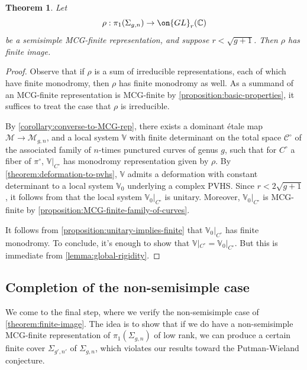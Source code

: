 \documentclass[12 pt]{amsart}
\theoremstyle{plain}
\newtheorem{theorem}[subsubsection]{Theorem}
\theoremstyle{definition}
\theoremstyle{remark}
\numberwithin{equation}{section}
\begin{document}
\begin{theorem}
	\label{theorem:finite-image-semisimple}
	Let $$\rho: \pi_1(\Sigma_{g,n})\to \on{GL}_r(\mathbb{C})$$ be a semisimple MCG-finite representation, and suppose $r<\sqrt{g+1}$. Then $\rho$ has finite image.
\end{theorem}
\begin{proof}
	Observe that if $\rho$ is a sum of irreducible representations, each of
	which have finite monodromy, then $\rho$ has finite monodromy as well.
	As a summand of an MCG-finite representation is MCG-finite by
	\autoref{proposition:basic-properties}, it suffices to treat the case that $\rho$ is irreducible.

	By \autoref{corollary:converse-to-MCG-rep}, there exists a dominant
	\'etale map $\mathscr{M}\to \mathscr{M}_{g,n}$, and a local system
	$\mathbb{V}$ with finite determinant on the total space $\mathscr{C}^\circ$ of the associated
	family of $n$-times punctured curves of genus $g$, such that for
	$C^\circ$ a fiber of $\pi^\circ$, $\mathbb{V}|_{{C}^\circ}$ has monodromy representation given by $\rho$. 
		By \autoref{theorem:deformation-to-pvhs}, $\mathbb V$ admits a deformation with constant determinant to a
	local system $\mathbb V_0$ underlying a complex PVHS.
	Since $r < 2\sqrt{g+1}$, it follows from \cite[Theorem
	1.2.12]{LL:geometric-local-systems} that
	the local system $\mathbb V_0|_{{C}^\circ}$ is unitary. Moreover, $\mathbb V_0|_{{C}^\circ}$ is MCG-finite by \autoref{proposition:MCG-finite-family-of-curves}.
	
	It follows from \autoref{proposition:unitary-implies-finite}
	that $\mathbb V_0|_{{C}^\circ}$ has finite monodromy.
	To conclude, it's enough to show that $\mathbb V|_{{C}^\circ} =
	\mathbb V_0|_{{C}^\circ}$.
	But this is immediate from \autoref{lemma:global-rigidity}.
\end{proof}

\subsection{Completion of the non-semisimple case}
\label{subsection:non-semisimple}
We come to the final step, where we verify the non-semisimple case of \autoref{theorem:finite-image}.
The idea is to show that if we do have a non-semisimple MCG-finite representation of $\pi_1(\Sigma_{g,n})$ of low rank, we
can produce a certain
 finite cover $\Sigma_{g',n'}$ of $\Sigma_{g,n}$, which violates 
our results toward the Putman-Wieland conjecture.
\end{document}
